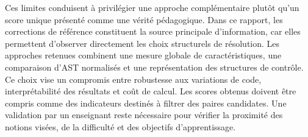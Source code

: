 \documentclass[12pt,a4paper,oneside]{report}
\begin{document}
Ces limites conduisent à privilégier une approche complémentaire plutôt qu'un
score unique présenté comme une vérité pédagogique. Dans ce rapport, les
corrections de référence constituent la source principale d'information, car
elles permettent d'observer directement les choix structurels de résolution.
Les approches retenues combinent une mesure globale de caractéristiques, une
comparaison d'AST normalisés et une représentation des structures de contrôle.
Ce choix vise un compromis entre robustesse aux variations de code,
interprétabilité des résultats et coût de calcul. Les scores obtenus doivent
être compris comme des indicateurs destinés à filtrer des paires candidates.
Une validation par un enseignant reste nécessaire pour vérifier la proximité
des notions visées, de la difficulté et des objectifs d'apprentissage.
\end{document}
